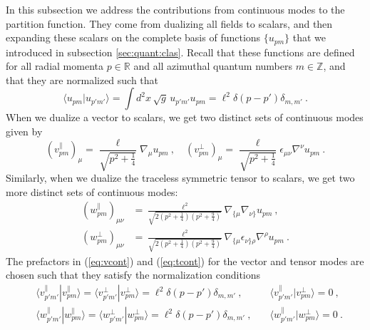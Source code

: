 \documentclass[12pt]{article}
\begin{document}
In this subsection we address the  contributions from continuous modes to the partition function. They come from dualizing all fields to scalars, and then expanding these scalars on the complete basis of functions $\{ u_{p m}\}$ that we introduced in subsection \ref{sec:quant:clas}.  Recall that these functions are defined for all radial momenta $p \in \mathbb{R}$ and all azimuthal quantum numbers $m \in \mathbb{Z}$, and that they are normalized such that
\begin{equation}
	\langle u_{p m} | u_{p' m'}\rangle = \int d^2x\, \sqrt{g}\, u_{p' m'} u_{p m} = \ell^2 \delta(p - p') \delta_{m,m'}~.
\end{equation}
%
When we dualize a vector to scalars, we get two distinct sets of continuous modes given by
\begin{equation}
	(v^{\parallel}_{p m})_{\mu} = \frac{\ell}{\sqrt{p^2 + \frac{1}{4}}}\nabla_\mu u_{p m}~, \quad (v^{\perp}_{p m})_\mu = \frac{\ell}{\sqrt{p^2 + \frac{1}{4}}}\epsilon_{\mu\nu}\nabla^\nu u_{p m}~.
\label{eq:vcont}
\end{equation}
Similarly, when we dualize the traceless symmetric tensor to scalars, we get two more distinct sets of continuous modes:
\begin{equation}\begin{aligned}
	(w^{\parallel}_{p m})_{\mu\nu} &= \frac{\ell^2}{\sqrt{2\left(p^2 + \frac{1}{4}\right) \left(p^2 + \frac{9}{4}\right)}} \nabla_{\{\mu} \nabla_{\nu\}} u_{p m}~, \\
	(w^{\perp}_{p m})_{\mu\nu} &= \frac{\ell^2}{\sqrt{2\left(p^2 + \frac{1}{4}\right) \left(p^2 + \frac{9}{4}\right)}} \nabla_{\{\mu} \epsilon_{\nu\}\rho}\nabla^\rho u_{p m}~.
\label{eq:tcont}
\end{aligned}\end{equation}
The prefactors in (\ref{eq:vcont}) and (\ref{eq:tcont}) for the vector and tensor modes are chosen such that they satisfy the normalization conditions
\begin{equation}\begin{aligned}
	&\langle v_{p' m'}^{\parallel} | v_{p  m}^{\parallel}\rangle = \langle v_{p' m'}^{\perp} | v_{p m}^{\perp}\rangle = \ell^2 \delta(p - p') \delta_{m, m'}~, \quad &\langle v_{p' m'}^{\parallel} | v_{p m}^{\perp}\rangle = 0~,  \\
	&\langle w_{p' m'}^{\parallel} | w_{p m}^{\parallel}\rangle = \langle w_{p' m'}^{\perp} | w_{p m}^{\perp}\rangle = \ell^2\delta(p - p')\delta_{m,m'}~, \quad &\langle w_{p' m'}^{\parallel} | w_{p  m}^{\perp}\rangle = 0~.
\end{aligned}\end{equation}
\end{document}
